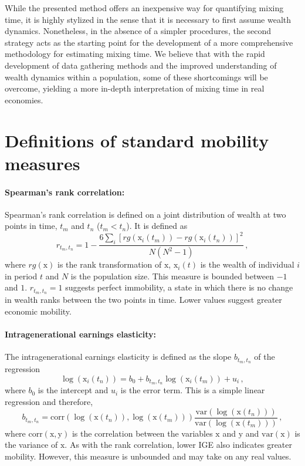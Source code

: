 \documentclass[11pt]{article}
\newcommand{\be}{\begin{equation}}
\newcommand{\ee}{\end{equation}}
\numberwithin{equation}{section}
\begin{document}
While the presented method offers an inexpensive way for quantifying mixing time, it is highly stylized in the sense that it is necessary to first assume wealth dynamics. Nonetheless, in the absence of a simpler procedures, the second strategy acts as the starting point for the development of a more comprehensive methodology for estimating mixing time. We believe that with the rapid development of data gathering methods and the improved understanding of wealth dynamics within a population, some of these shortcomings will be overcome, yielding a more in-depth interpretation of mixing time in real economies.



\appendix
\section{Definitions of standard mobility measures}\label{sec:standard-mobility-measures}

\paragraph{Spearman's rank correlation:} Spearman's rank correlation is defined on a joint distribution of wealth at two points in time, $t_m$ and $t_n$ ($t_m < t_n$). It is defined as
%
\be
    r_{t_m,t_n} = 1 - \frac{6\sum_i \left[rg\left(\mathrm{x}_i\left(t_m\right)\right) - rg\left(\mathrm{x}_i\left(t_n\right)\right)\right]^2}{N\left(N^2-1\right)}\,,
\ee
%
where $rg(\mathrm{x})$ is the rank transformation of $\mathrm{x}$, $\mathrm{x}_i(t)$ is the wealth of individual $i$ in period $t$ and $N$ is the population size. This measure is bounded between $-1$ and $1$. $r_{t_m,t_n} = 1$ suggests perfect immobility, a state in which there is no change in wealth ranks between the two points in time. Lower values suggest greater economic mobility.

\paragraph{Intragenerational earnings elasticity:} The intragenerational earnings elasticity is defined as the slope $b_{t_m,t_n}$ of the regression
%
\be
   \log\left(\mathrm{x}_i\left(t_n\right)\right) = b_0 + b_{t_m,t_n} \log\left(\mathrm{x}_i\left(t_m\right)\right) + u_i\,,
\ee
%
where $b_0$ is the intercept and $u_i$ is the error term. This is a simple linear regression and therefore,
%
\be
    b_{t_m,t_n} = \mathrm{corr}\left(\log\left(\mathrm{x}\left(t_n\right)\right),\log\left(\mathrm{x}\left(t_m\right)\right)\right) \frac{\mathrm{var}\left(\log\left(\mathrm{x}\left(t_n\right)\right)\right)}{\mathrm{var}\left(\log\left(\mathrm{x}\left(t_m\right)\right)\right)}\,,
    \label{eq:iee-estimation}
\ee
%
where $\mathrm{corr}(\mathrm{x},\mathrm{y})$ is the correlation between the variables $\mathrm{x}$ and $\mathrm{y}$ and $\mathrm{var}(\mathrm{x})$ is the variance of $\mathrm{x}$. As with the rank correlation, lower IGE also indicates greater mobility. However, this measure is unbounded and may take on any real values.
\end{document}
